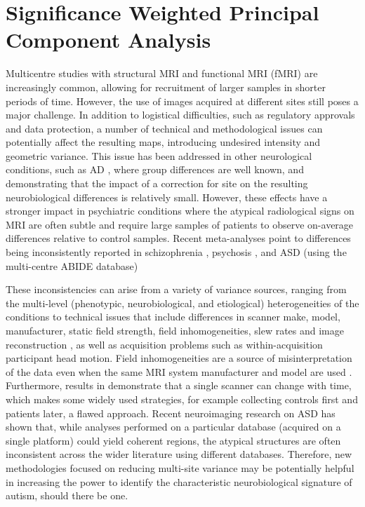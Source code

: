 \chapter{Significance Weighted Principal Component Analysis}\label{ch:swpca}
Multicentre studies with structural \ac{MRI} and functional \ac{MRI} (f\ac{MRI}) are increasingly common, allowing for recruitment of larger samples in shorter periods of time. However, the use of images acquired at different sites still poses a major challenge. In addition to logistical difficulties, such as regulatory approvals and data protection, a number of technical and methodological issues can potentially affect the resulting maps, introducing undesired intensity and geometric variance. This issue has been addressed in other neurological conditions, such as \ac{AD} \cite{Jovicich2006,Stonnington2008}, where group differences are well known, and demonstrating that the impact of a correction for site on the resulting neurobiological differences is relatively small. However, these effects have a stronger impact in psychiatric conditions where the atypical radiological signs on \ac{MRI} are often subtle and require large samples of patients to observe on-average differences relative to control samples. Recent meta-analyses point to differences being inconsistently reported in schizophrenia \cite{friedman2006report,Turner2013}, psychosis \cite{Clementz2015,Wang2015}, and \ac{ASD} (using the multi-centre ABIDE database) \cite{haar2014anatomical}

These inconsistencies can arise from a variety of variance sources, ranging from the multi-level (phenotypic, neurobiological, and etiological) heterogeneities of the conditions to technical issues that include differences in scanner make, model, manufacturer, static field strength, field inhomogeneities, slew rates and image reconstruction \cite{VanHorn2009}, as well as acquisition problems such as within-acquisition participant head motion. Field inhomogeneities are a source of misinterpretation of the data even when the same \ac{MRI} system manufacturer and model are used \cite{VanHorn2009}. Furthermore, results in \cite{Pearlson2009} demonstrate that a single scanner can change with time, which makes some widely used strategies, for example collecting controls first and patients later, a flawed approach. Recent neuroimaging research on \ac{ASD} \cite{haar2014anatomical} has shown that, while analyses performed on a particular database (acquired on a single platform) could yield coherent regions, the atypical structures are often inconsistent across the wider literature using different databases. Therefore, new methodologies focused on reducing multi-site variance may be potentially helpful in increasing the power to identify the characteristic neurobiological signature of autism, should there be one. 

